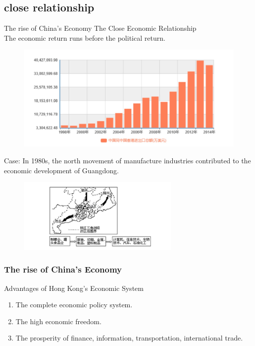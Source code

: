 \documentclass[slidestop,uncompress,mathsans, 12pt]{beamer}
\begin{document}
\subsection{close relationship}
\begin{frame}{The rise of China's Economy}
The Close Economic Relationship\\
\bigskip
The economic return runs before the political return. \\
\begin{overprint}

\begin{figure}[h!]
\centering
\includegraphics[width=1.05\textwidth]{hk6.jpg}
\label{threadsVsSync}
\end{figure}
Case: In 1980s,  the north movement of manufacture industries contributed to the economic development of Guangdong.\\ 
\begin{figure}[h!]
\centering
\includegraphics[width=0.7\textwidth]{hk7.jpg}
\label{threadsVsSync}
\end{figure}
\end{overprint}
\end{frame}

\begin{frame}
\frametitle{The rise of China's Economy}
Advantages of Hong Kong's Economic System\\
\bigskip
\begin{enumerate}
\item The complete economic policy system.
\bigskip
\item The high economic freedom.
\bigskip
\item The prosperity of finance, information, transportation, international trade.
\bigskip 
\end{enumerate}

\end{frame}
\end{document}
